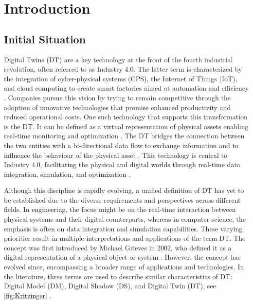 \chapter{Introduction}
\label{chap:introduction}

\section{Initial Situation}
Digital Twins (DT) are a key technology at the front of the fourth industrial revolution, often referred to as Industry 4.0.
The latter term is characterized by the integration of cyber-physical systems (CPS), the Internet of Things (IoT), and cloud computing to create smart factories aimed at automation and efficiency \autocite{Oztemel2020}. Companies pursue this vision by trying to remain competitive through the adoption of innovative technologies that promise enhanced productivity and reduced operational costs. One such technology that supports this transformation is the DT. It can be defined as a virtual representation of physical assets enabling real-time monitoring and optimization \autocite{Tao2018ijamt}. The DT bridges the connection between the two entities with a bi-directional data flow to exchange information and to influence the behaviour of the physical asset \autocite{grieves2014digital}. This technology is central to Industry 4.0, facilitating the physical and digital worlds through real-time data integration, simulation, and optimization \autocite{judijanto2024trends}.

Although this discipline is rapidly evolving, a unified definition of DT has yet to be established due to the diverse requirements and perspectives across different fields. In engineering, the focus might be on the real-time interaction between physical systems and their digital counterparts, whereas in computer science, the emphasis is often on data integration and simulation capabilities. These varying priorities result in multiple interpretations and applications of the term DT. The concept was first introduced by Michael Grieves in 2002, who defined it as a digital representation of a physical object or system \autocite{grieves2014digital}. However, the concept has evolved since, encompassing a broader range of applications and technologies. In the literature, three terms are used to describe similar characteristics of DT: Digital Model (DM), Digital Shadow (DS), and Digital Twin (DT), see \autoref{fig:Kritzinger} \autocite{jones2020characterising,Zhang2021jmsy}.

